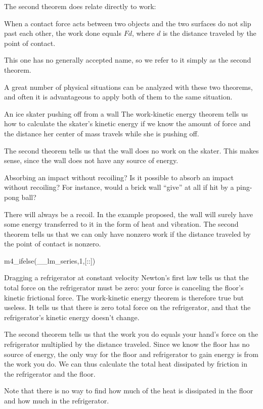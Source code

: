 The second theorem does relate directly to work:

\begin{lessimportant}
When a contact force acts between two objects and the two surfaces
do not slip past each other, the work done equals $Fd$, where $d$ is
the distance traveled by the point of contact.
\end{lessimportant}

\noindent This one has no generally accepted name, so we refer to it
simply as the second theorem.

A great number of physical situations can be analyzed with
these two theorems, and often it is advantageous to apply
both of them to the same situation.

\begin{eg}{An ice skater pushing off from a wall}
The work-kinetic energy theorem tells us how to calculate
the skater's kinetic energy if we know the amount of force
and the distance her center of mass travels while she is pushing off.

The second theorem tells us that the wall does no work on
the skater. This makes sense, since the wall does not have
any source of energy.
\end{eg}

\begin{eg}{Absorbing an impact without recoiling?}
\egquestion Is it possible to absorb an impact without
recoiling? For instance, would a brick wall ``give'' at all
if hit by a ping-pong ball?

\eganswer There will always be a recoil. In the example
proposed, the wall will surely have some energy transferred
to it in the form of heat and vibration. The second theorem
tells us that we can only have nonzero work if the distance
traveled by the point of contact is nonzero.
\end{eg}

m4_ifelse(__lm_series,1,[:\pagebreak[4]:])

\begin{eg}{Dragging a refrigerator at constant velocity}
Newton's first law tells us that the total force on the
refrigerator must be zero: your force is canceling the
floor's kinetic frictional force. The work-kinetic energy
theorem is therefore true but useless. It tells us that
there is zero total force on the refrigerator, and that the
refrigerator's kinetic energy doesn't change.

The second theorem tells us that the work you do equals
your hand's force on the refrigerator multiplied by the
distance traveled. Since we know the floor has no source of
energy, the only way for the floor and refrigerator to gain
energy is from the work you do. We can thus calculate the
total heat dissipated by friction in the refrigerator and the floor.

Note that there is no way to find how much of the heat is
dissipated in the floor and how much in the refrigerator.
\end{eg}

